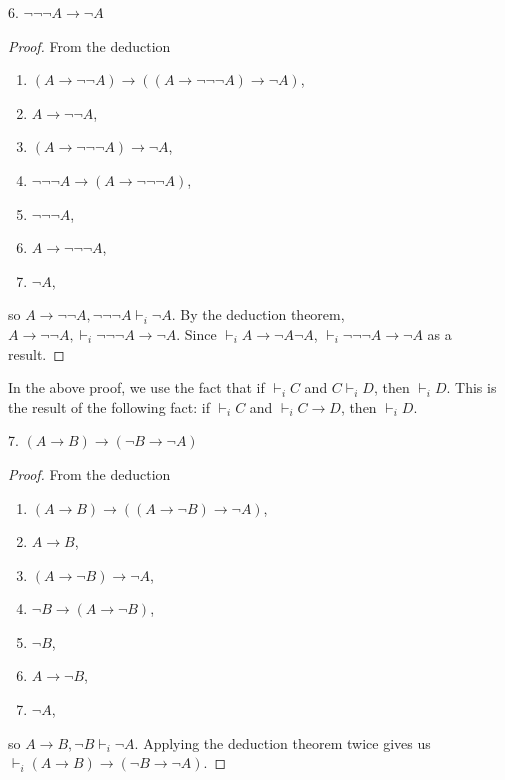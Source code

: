 \documentclass[12pt]{article}
\begin{document}
6. $\neg \neg \neg A \to \neg A$
\begin{proof} From the deduction
\begin{multicols}{2}
\begin{enumerate}
\item $(A \to  \neg \neg A)\to ((A \to \neg \neg \neg A) \to \neg A)$,
\item $A \to \neg \neg A$,
\item $(A \to \neg \neg \neg A) \to \neg A$,
\item $\neg \neg \neg A \to (A \to \neg \neg \neg A)$,
\item $\neg \neg \neg A$,
\item $A \to \neg \neg \neg A$,
\item $\neg A$, 
\end{enumerate}
\end{multicols} 
so $A \to \neg \neg A, \neg \neg \neg A \vdash_i \neg A$.  By the deduction theorem, $A\to \neg \neg A, \vdash_i \neg \neg \neg A \to \neg A$.  Since $\vdash_i A \to \neg A\neg A$, $\vdash_i \neg \neg \neg A \to \neg A$ as a result.
\end{proof}
In the above proof, we use the fact that if $\vdash_i C$ and $C\vdash_i D$, then $\vdash_i D$.  This is the result of the following fact: if $\vdash_i C$ and $\vdash_i C\to D$, then $\vdash_i D$.

7. $(A\to B) \to (\neg B \to \neg A)$
\begin{proof} From the deduction
\begin{multicols}{2}
\begin{enumerate}
\item $(A\to B) \to ((A\to \neg B) \to \neg A)$,
\item $A \to B$,
\item $(A\to \neg B) \to \neg A$,
\item $\neg B \to (A\to \neg B)$,
\item $\neg B$,
\item $A\to \neg B$,
\item $\neg A$,
\end{enumerate}
\end{multicols}
so $A\to B, \neg B \vdash_i \neg A$.  Applying the deduction theorem twice gives us $\vdash_i (A \to B)\to (
\neg B \to \neg A)$.
\end{proof}
\end{document}
